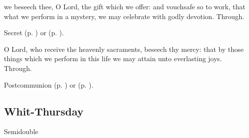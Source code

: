 
\secret
{} we beseech thee, O Lord, the gift which we offer: and vouchsafe so to work, that what we perform in a mystery, we may celebrate with godly devotion. Through.
\begin{rubric}
     Secret  (p. \pageref{SPAgainst}) or  (p. \pageref{SPChiefBishop}).
\end{rubric}


\postcommunion
{} O Lord, who receive the heavenly sacraments, beseech thy mercy: that by those things which we perform in this life we may attain unto everlasting joys. Through.
\begin{rubric}
     Postcommunion  (p. \pageref{SPAgainst}) or  (p. \pageref{SPChiefBishop}).
\end{rubric}


\subsection{Whit-Thursday}
\begin{inhead}
    {Semidouble}
\end{inhead}
\fancyhead[RE,LO]{}


